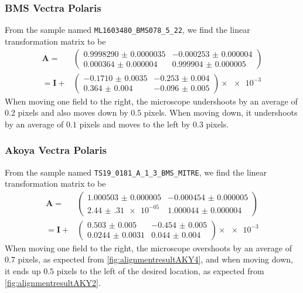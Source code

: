 \documentclass{article}
\newcommand{\matrixbold}[1]{\mathbf{#1}}
\begin{document}
\subsubsection{BMS Vectra Polaris}

From the sample named \texttt{ML1603480\_BMS078\_5\_22}, we find the linear transformation matrix to be
\begin{align}
\matrixbold{A}=&\begin{pmatrix}
\num{0.9998290(35)} &
\num{-0.000253(4)} \\
\num{0.000364(4)} &
\num{0.999904(5)}
\end{pmatrix} \\
=\matrixbold{I} + &\begin{pmatrix}
\num{-0.1710(35)} &
\num{-0.253(4)} \\
\num{0.364(4)} &
\num{-0.096(5)}
\end{pmatrix} \times \num{e-3}
\label{eq:Amatrix_ML1603474_BMS069_5_21}
\end{align}
When moving one field to the right, the microscope undershoots by an average of $0.2$ pixels and also moves down by $0.5$ pixels.  When moving down, it undershoots by an average of $0.1$ pixels and moves to the left by $0.3$ pixels.

\subsubsection{Akoya Vectra Polaris}

From the sample named \texttt{TS19\_0181\_A\_1\_3\_BMS\_MITRE}, we find the linear transformation matrix to be
\begin{align}
\matrixbold{A}=&\begin{pmatrix}
\num{1.000503(5)} &
\num{-0.000454(5)} \\ 
\num{2.44(31)e-05} &
\num{1.000044(4)}
\end{pmatrix} \\
=\matrixbold{I} + &\begin{pmatrix}
\num{0.503(5)} &
\num{-0.454(5)} \\
\num{0.0244(31)} &
\num{0.044(4)}
\end{pmatrix} \times \num{e-3}
\label{eq:Amatrix_TS18_0541_BMS_MITRE}
\end{align}
When moving one field to the right, the microscope overshoots by an average of $0.7$ pixels, as expected from \cref{fig:alignmentresultAKY4}, and when moving down, it ends up $0.5$ pixels to the left of the desired location, as expected from \cref{fig:alignmentresultAKY2}.
\end{document}
